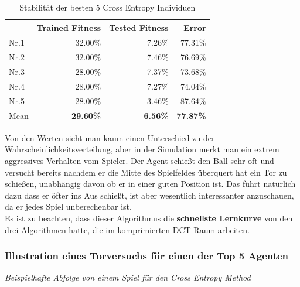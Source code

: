                 \begin{table}[H]
                    \begin{center}
                    \begin{tabular}{ |l|r|r|r| } 
                        \hline
                        \hfill & Trained Fitness   & Tested Fitness  &          Error    \\ \hline
                          Nr.1 &          32.00\%  &          7.26\% &          77.31\%  \\  
                          Nr.2 &          32.00\%  &          7.46\% &          76.69\%  \\  
                          Nr.3 &          28.00\%  &          7.37\% &          73.68\%  \\ 
                          Nr.4 &          28.00\%  &          7.27\% &          74.04\%  \\ 
                          Nr.5 &          28.00\%  &          3.46\% &          87.64\%  \\ \hline
                          Mean &  \textbf{29.60\%} & \textbf{6.56\%} & \textbf{77.87\%}  \\ \hline
                    \end{tabular}
                    \end{center}
                    \caption{Stabilität der besten 5 Cross Entropy Individuen \label{fig:crossentropytable}}
                \end{table}
                \noindent
                Von den Werten sieht man kaum einen Unterschied zu der Wahrscheinlichkeitsverteilung, aber in der Simulation merkt man ein extrem aggressives Verhalten vom Spieler. Der Agent schießt den Ball sehr oft und versucht bereits nachdem er die Mitte des Spielfeldes überquert hat ein Tor zu schießen, unabhängig davon ob er in einer guten Position ist. Das führt natürlich dazu dass er öfter ins Aus schießt, ist aber wesentlich interessanter anzuschauen, da er jedes Spiel unberechenbar ist. \\[2mm]

                \noindent
                Es ist zu beachten, dass dieser Algorithmus die \textbf{schnellste Lernkurve} von den drei Algorithmen hatte, die im komprimierten DCT Raum arbeiten.
\newpage
                \subsubsection*{Illustration eines Torversuchs für einen der Top 5 Agenten}
                \begin{center} \textit{Beispielhafte Abfolge von einem Spiel für den Cross Entropy Method} \end{center}
\newpage
